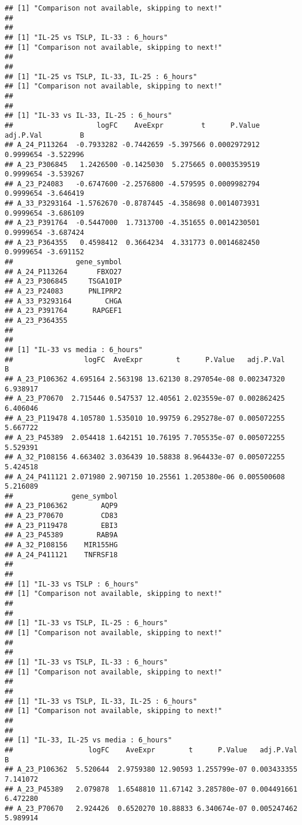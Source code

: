 \documentclass[
]{article}
\begin{document}
\begin{verbatim}
## [1] "Comparison not available, skipping to next!"
## 
## 
## [1] "IL-25 vs TSLP, IL-33 : 6_hours"
## [1] "Comparison not available, skipping to next!"
## 
## 
## [1] "IL-25 vs TSLP, IL-33, IL-25 : 6_hours"
## [1] "Comparison not available, skipping to next!"
## 
## 
## [1] "IL-33 vs IL-33, IL-25 : 6_hours"
##                    logFC    AveExpr         t      P.Value adj.P.Val         B
## A_24_P113264  -0.7933282 -0.7442659 -5.397566 0.0002972912 0.9999654 -3.522996
## A_23_P306845   1.2426500 -0.1425030  5.275665 0.0003539519 0.9999654 -3.539267
## A_23_P24083   -0.6747600 -2.2576800 -4.579595 0.0009982794 0.9999654 -3.646419
## A_33_P3293164 -1.5762670 -0.8787445 -4.358698 0.0014073931 0.9999654 -3.686109
## A_23_P391764  -0.5447000  1.7313700 -4.351655 0.0014230501 0.9999654 -3.687424
## A_23_P364355   0.4598412  0.3664234  4.331773 0.0014682450 0.9999654 -3.691152
##               gene_symbol
## A_24_P113264       FBXO27
## A_23_P306845     TSGA10IP
## A_23_P24083      PNLIPRP2
## A_33_P3293164        CHGA
## A_23_P391764      RAPGEF1
## A_23_P364355             
## 
## 
## [1] "IL-33 vs media : 6_hours"
##                 logFC  AveExpr        t      P.Value   adj.P.Val        B
## A_23_P106362 4.695164 2.563198 13.62130 8.297054e-08 0.002347320 6.938917
## A_23_P70670  2.715446 0.547537 12.40561 2.023559e-07 0.002862425 6.406046
## A_23_P119478 4.105780 1.535010 10.99759 6.295278e-07 0.005072255 5.667722
## A_23_P45389  2.054418 1.642151 10.76195 7.705535e-07 0.005072255 5.529391
## A_32_P108156 4.663402 3.036439 10.58838 8.964433e-07 0.005072255 5.424518
## A_24_P411121 2.071980 2.907150 10.25561 1.205380e-06 0.005500608 5.216089
##              gene_symbol
## A_23_P106362        AQP9
## A_23_P70670         CD83
## A_23_P119478        EBI3
## A_23_P45389        RAB9A
## A_32_P108156    MIR155HG
## A_24_P411121    TNFRSF18
## 
## 
## [1] "IL-33 vs TSLP : 6_hours"
## [1] "Comparison not available, skipping to next!"
## 
## 
## [1] "IL-33 vs TSLP, IL-25 : 6_hours"
## [1] "Comparison not available, skipping to next!"
## 
## 
## [1] "IL-33 vs TSLP, IL-33 : 6_hours"
## [1] "Comparison not available, skipping to next!"
## 
## 
## [1] "IL-33 vs TSLP, IL-33, IL-25 : 6_hours"
## [1] "Comparison not available, skipping to next!"
## 
## 
## [1] "IL-33, IL-25 vs media : 6_hours"
##                  logFC    AveExpr        t      P.Value   adj.P.Val        B
## A_23_P106362  5.520644  2.9759380 12.90593 1.255799e-07 0.003433355 7.141072
## A_23_P45389   2.079878  1.6548810 11.67142 3.285780e-07 0.004491661 6.472280
## A_23_P70670   2.924426  0.6520270 10.88833 6.340674e-07 0.005247462 5.989914

\end{verbatim}
\end{document}
